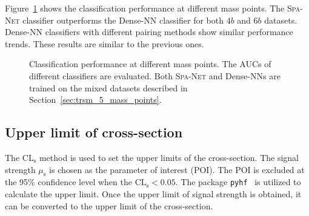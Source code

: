 \documentclass[12pt]{article}
\begin{document}
        Figure~\ref{fig:classification_performance_each_mass_point-TRSM-mix_5-1M} shows the classification performance at different mass points. The \textsc{Spa-Net} classifier outperforms the Dense-NN classifier for both $4b$ and $6b$ datasets. Dense-NN classifiers with different pairing methods show similar performance trends. These results are similar to the previous ones.  
        \begin{figure}[htpb]
            \centering
            \caption{Classification performance at different mass points. The AUCs of different classifiers are evaluated. Both \textsc{Spa-Net} and Dense-NNs are trained on the mixed datasets described in Section~\ref{sec:trsm_5_mass_points}.}  
            \label{fig:classification_performance_each_mass_point-TRSM-mix_5-1M}  
        \end{figure}
    \subsection{Upper limit of cross-section}%
    \label{sub:upper_limit_of_cross_section}
        The $\text{CL}_{\text{s}}$ method is used to set the upper limits of the cross-section. The signal strength $\mu_{\text{s}}$ is chosen as the parameter of interest (POI). The POI is excluded at the 95\% confidence level when the $\text{CL}_{\text{s}} < 0.05$. The package \verb|pyhf|~\cite{pyhf,pyhf_joss} is utilized to calculate the upper limit. Once the upper limit of signal strength is obtained, it can be converted to the upper limit of the cross-section.
\end{document}
